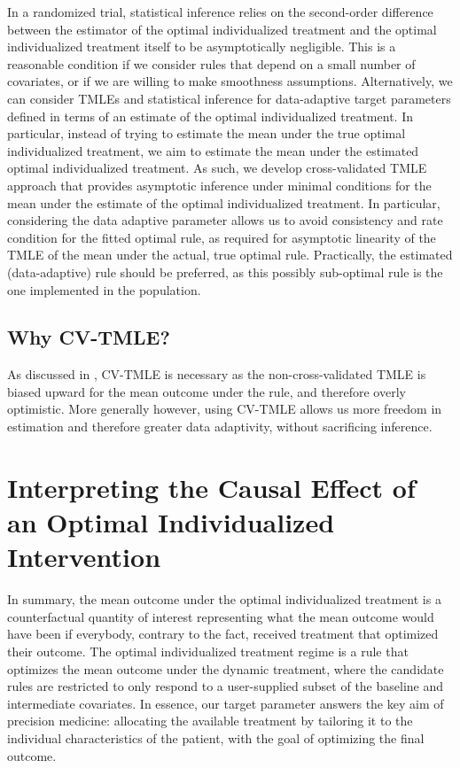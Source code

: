 \documentclass[12pt, krantz2,]{book}
\theoremstyle{definition}
\theoremstyle{definition}
\theoremstyle{definition}
\newcommand{\1}{\mathbbm{1}}
\begin{document}
In a randomized trial, statistical inference relies on the second-order
difference between the estimator of the optimal individualized treatment and the
optimal individualized treatment itself to be asymptotically negligible. This is
a reasonable condition if we consider rules that depend on a small number of
covariates, or if we are willing to make smoothness assumptions. Alternatively,
we can consider TMLEs and statistical inference for data-adaptive target
parameters defined in terms of an estimate of the optimal individualized
treatment. In particular, instead of trying to estimate the mean under the true
optimal individualized treatment, we aim to estimate the mean under the
estimated optimal individualized treatment. As such, we develop cross-validated
TMLE approach that provides asymptotic inference under minimal conditions for
the mean under the estimate of the optimal individualized treatment. In
particular, considering the data adaptive parameter allows us to avoid
consistency and rate condition for the fitted optimal rule, as required for
asymptotic linearity of the TMLE of the mean under the actual, true optimal
rule. Practically, the estimated (data-adaptive) rule should be preferred, as
this possibly sub-optimal rule is the one implemented in the population.

\hypertarget{why-cv-tmle}{%
\subsection{Why CV-TMLE?}\label{why-cv-tmle}}

As discussed in \citet{vanderLaanLuedtke15}, CV-TMLE is necessary as the
non-cross-validated TMLE is biased upward for the mean outcome under the rule,
and therefore overly optimistic. More generally however, using CV-TMLE allows us
more freedom in estimation and therefore greater data adaptivity, without
sacrificing inference.

\hypertarget{interpreting-the-causal-effect-of-an-optimal-individualized-intervention}{%
\section{Interpreting the Causal Effect of an Optimal Individualized Intervention}\label{interpreting-the-causal-effect-of-an-optimal-individualized-intervention}}

In summary, the mean outcome under the optimal individualized treatment is a
counterfactual quantity of interest representing what the mean outcome would
have been if everybody, contrary to the fact, received treatment that optimized
their outcome. The optimal individualized treatment regime is a rule that
optimizes the mean outcome under the dynamic treatment, where the candidate
rules are restricted to only respond to a user-supplied subset of the baseline
and intermediate covariates. In essence, our target parameter answers the key
aim of precision medicine: allocating the available treatment by tailoring it to
the individual characteristics of the patient, with the goal of optimizing the
final outcome.
\end{document}
